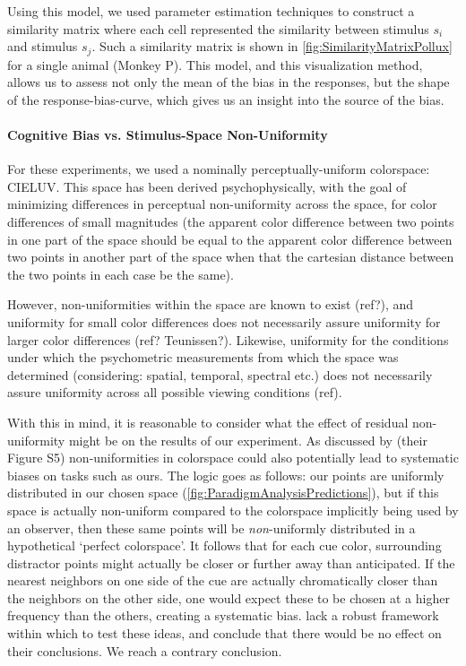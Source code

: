 Using this model, we used parameter estimation techniques to construct a similarity matrix where each cell represented the similarity between stimulus $s_i$ and stimulus $s_j$. 
Such a similarity matrix is shown in \autoref{fig:SimilarityMatrixPollux} for a single animal (Monkey P).
This model, and this visualization method, allows us to assess not only the mean of the bias in the responses, but the shape of the response-bias-curve, which gives us an insight into the source of the bias.

\paragraph{Cognitive Bias vs. Stimulus-Space Non-Uniformity}

For these experiments, we used a nominally perceptually-uniform colorspace: CIELUV. 
This space has been derived psychophysically, with the goal of minimizing differences in perceptual non-uniformity across the space, for color differences of small magnitudes (the apparent color difference between two points in one part of the space should be equal to the apparent color difference between two points in another part of the space when that the cartesian distance between the two points in each case be the same).

However, non-uniformities within the space are known to exist (ref?), and uniformity for small color differences does not necessarily assure uniformity for larger color differences (ref? Teunissen?). %
Likewise, uniformity for the conditions under which the psychometric measurements from which the space was determined (considering: spatial, temporal, spectral etc.) does not necessarily assure uniformity across all possible viewing conditions (ref).

With this in mind, it is reasonable to consider what the effect of residual non-uniformity might be on the results of our experiment. 
As discussed by \cite{panichello_error-correcting_2019} (their Figure S5) non-uniformities in colorspace could also potentially lead to systematic biases on tasks such as ours. %
The logic goes as follows: our points are uniformly distributed in our chosen space (\autoref{fig:ParadigmAnalysisPredictions}), but if this space is actually non-uniform compared to the colorspace implicitly being used by an observer, then these same points will be \emph{non}-uniformly distributed in a hypothetical `perfect colorspace'. 
It follows that for each cue color, surrounding distractor points might actually be closer or further away than anticipated. 
If the nearest neighbors on one side of the cue are actually chromatically closer than the neighbors on the other side, one would expect these to be chosen at a higher frequency than the others, creating a systematic bias.
\cite{panichello_error-correcting_2019} lack a robust framework within which to test these ideas, and conclude that there would be no effect on their conclusions. We reach a contrary conclusion.

